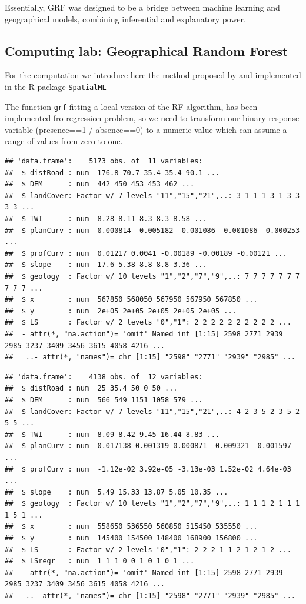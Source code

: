 \documentclass[
]{article}
\begin{document}
Essentially, GRF was designed to be a bridge between machine learning and geographical models, combining inferential and explanatory power.

\subsection{Computing lab: Geographical Random Forest}\label{computing-lab-geographical-random-forest}

For the computation we introduce here the method proposed by \citet{Georganos_forest_2022} and implemented in the R package \texttt{SpatialML} \citep{SpatialML}

The function \texttt{grf} fitting a local version of the RF algorithm, has been implemented fro regression problem, so we need to transform our binary response variable (presence==1 / absence==0) to a numeric value which can assume a range of values from zero to one.

\begin{verbatim}
## 'data.frame':    5173 obs. of  11 variables:
##  $ distRoad : num  176.8 70.7 35.4 35.4 90.1 ...
##  $ DEM      : num  442 450 453 453 462 ...
##  $ landCover: Factor w/ 7 levels "11","15","21",..: 3 1 1 1 3 1 3 3 3 3 ...
##  $ TWI      : num  8.28 8.11 8.3 8.3 8.58 ...
##  $ planCurv : num  0.000814 -0.005182 -0.001086 -0.001086 -0.000253 ...
##  $ profCurv : num  0.01217 0.0041 -0.00189 -0.00189 -0.00121 ...
##  $ slope    : num  17.6 5.38 8.8 8.8 3.36 ...
##  $ geology  : Factor w/ 10 levels "1","2","7","9",..: 7 7 7 7 7 7 7 7 7 7 ...
##  $ x        : num  567850 568050 567950 567950 567850 ...
##  $ y        : num  2e+05 2e+05 2e+05 2e+05 2e+05 ...
##  $ LS       : Factor w/ 2 levels "0","1": 2 2 2 2 2 2 2 2 2 2 ...
##  - attr(*, "na.action")= 'omit' Named int [1:15] 2598 2771 2939 2985 3237 3409 3456 3615 4058 4216 ...
##   ..- attr(*, "names")= chr [1:15] "2598" "2771" "2939" "2985" ...
\end{verbatim}

\begin{verbatim}
## 'data.frame':    4138 obs. of  12 variables:
##  $ distRoad : num  25 35.4 50 0 50 ...
##  $ DEM      : num  566 549 1151 1058 579 ...
##  $ landCover: Factor w/ 7 levels "11","15","21",..: 4 2 3 5 2 3 5 2 5 5 ...
##  $ TWI      : num  8.09 8.42 9.45 16.44 8.83 ...
##  $ planCurv : num  0.017138 0.001319 0.000871 -0.009321 -0.001597 ...
##  $ profCurv : num  -1.12e-02 3.92e-05 -3.13e-03 1.52e-02 4.64e-03 ...
##  $ slope    : num  5.49 15.33 13.87 5.05 10.35 ...
##  $ geology  : Factor w/ 10 levels "1","2","7","9",..: 1 1 1 2 1 1 1 1 5 1 ...
##  $ x        : num  558650 536550 560850 515450 535550 ...
##  $ y        : num  145400 154500 148400 168900 156800 ...
##  $ LS       : Factor w/ 2 levels "0","1": 2 2 2 1 1 2 1 2 1 2 ...
##  $ LSregr   : num  1 1 1 0 0 1 0 1 0 1 ...
##  - attr(*, "na.action")= 'omit' Named int [1:15] 2598 2771 2939 2985 3237 3409 3456 3615 4058 4216 ...
##   ..- attr(*, "names")= chr [1:15] "2598" "2771" "2939" "2985" ...
\end{verbatim}
\end{document}

